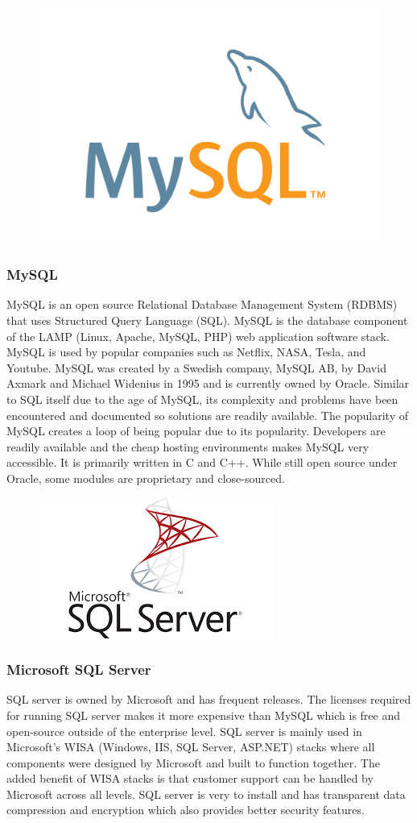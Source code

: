 \documentclass[12pt]{report}
\begin{document}
\begin{figure}[h]
	\centering
	\includegraphics[width=0.251\linewidth]{mysql}
\end{figure}

\subsubsection*{MySQL}

MySQL is an open source Relational Database Management System (RDBMS) that uses Structured Query Language (SQL).  MySQL is the database component of the LAMP (Linux, Apache, MySQL, PHP) web application software stack.  MySQL is used by popular companies such as Netflix, NASA, Tesla, and Youtube.  MySQL was created by a Swedish company, MySQL AB, by David Axmark and Michael Widenius in 1995 and is currently owned by Oracle.  Similar to SQL itself due to the age of MySQL, its complexity and problems have been encountered and documented so solutions are readily available.  The popularity of MySQL creates a loop of being popular due to its popularity.  Developers are readily available and the cheap hosting environments makes MySQL very accessible.  It is primarily written in C and C++.  While still open source under Oracle, some modules are proprietary and close-sourced.  

\begin{figure}[h]
	\centering
	\includegraphics[width=0.251\linewidth]{microsoftsql}
\end{figure}

\subsubsection*{Microsoft SQL Server}

SQL server is owned by Microsoft and has frequent releases.  The licenses required for running SQL server makes it more expensive than MySQL which is free and open-source outside of the enterprise level.  SQL server is mainly used in Microsoft’s WISA (Windows, IIS, SQL Server, ASP.NET) stacks where all components were designed by Microsoft and built to function together.  The added benefit of WISA stacks is that customer support can be handled by Microsoft across all levels.  SQL server is very to install and has transparent data compression and encryption which also provides better security features. 
\end{document}

